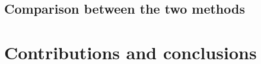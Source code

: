     \section{Comparison between the two methods}
   
\chapter{Contributions and conclusions}

\cleardoublepage
{}

% 
% 
% 


